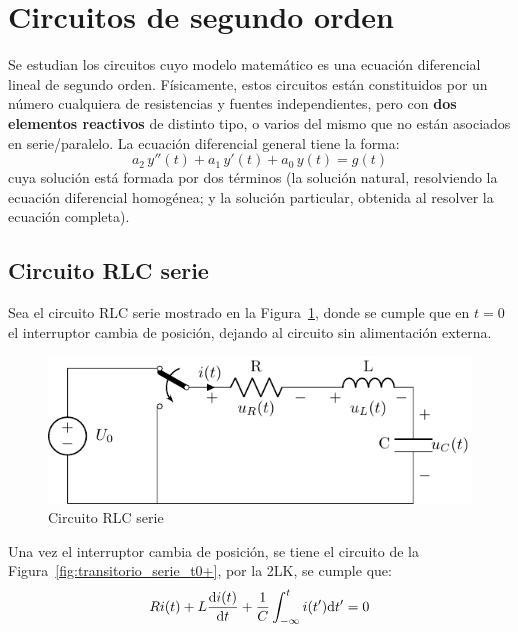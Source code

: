 \section{Circuitos de segundo orden}
Se estudian los circuitos cuyo modelo matemático es una ecuación
diferencial lineal de segundo orden. Físicamente, estos circuitos
están constituidos por un número cualquiera de resistencias y fuentes
independientes, pero con \textbf{dos elementos reactivos} de distinto
tipo, o varios del mismo que no están asociados en serie/paralelo. La
ecuación diferencial general tiene la forma:
\begin{equation*}
  a_2\,y''(t)+a_1\,y'(t)+a_0\,y(t)=g(t)
\end{equation*}
cuya solución está formada por dos términos (la solución natural,
resolviendo la ecuación diferencial homogénea; y la solución
particular, obtenida al resolver la ecuación completa).
	
\subsection{Circuito RLC serie}

Sea el circuito RLC serie mostrado en la
Figura~\ref{fig:transitorio_circuito_RLC_serie}, donde se cumple que
en $t = 0$ el interruptor cambia de posición, dejando al circuito sin
alimentación externa.
\begin{figure}[H]
  \centering
  \includegraphics{../figs/transitorio_circuitoRLC_serie.pdf}
  \caption{Circuito RLC serie}
  \label{fig:transitorio_circuito_RLC_serie}
\end{figure}

Una vez el interruptor cambia de posición, se tiene el circuito de la
Figura~\ref{fig:transitorio_serie_t0+}, por la 2LK, se cumple que:
\[
  Ri(t) + L\diff{i(t)}{t} + \frac{1}{C}\int_{-\infty}^t i(t')
  \mathrm{d}t' = 0
\]

